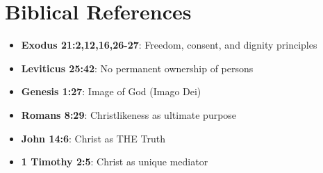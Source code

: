 \documentclass[12pt]{article}
\begin{document}
\section{Biblical References}

\begin{itemize}
    \item \textbf{Exodus 21:2,12,16,26-27}: Freedom, consent, and dignity principles
    \item \textbf{Leviticus 25:42}: No permanent ownership of persons
    \item \textbf{Genesis 1:27}: Image of God (Imago Dei)
    \item \textbf{Romans 8:29}: Christlikeness as ultimate purpose
    \item \textbf{John 14:6}: Christ as THE Truth
    \item \textbf{1 Timothy 2:5}: Christ as unique mediator
\end{itemize}
\end{document}
